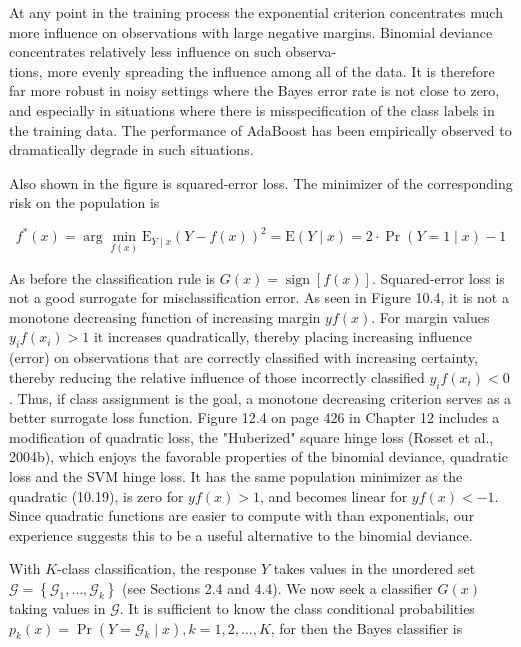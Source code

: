 \documentclass[10pt]{article}
\begin{document}
At any point in the training process the exponential criterion concentrates much more influence on observations with large negative margins. Binomial deviance concentrates relatively less influence on such observa-\\
tions, more evenly spreading the influence among all of the data. It is therefore far more robust in noisy settings where the Bayes error rate is not close to zero, and especially in situations where there is misspecification of the class labels in the training data. The performance of AdaBoost has been empirically observed to dramatically degrade in such situations.

Also shown in the figure is squared-error loss. The minimizer of the corresponding risk on the population is


\begin{equation*}
f^{*}(x)=\arg \min _{f(x)} \mathrm{E}_{Y \mid x}(Y-f(x))^{2}=\mathrm{E}(Y \mid x)=2 \cdot \operatorname{Pr}(Y=1 \mid x)-1 \tag{10.19}
\end{equation*}


As before the classification rule is $G(x)=\operatorname{sign}[f(x)]$. Squared-error loss is not a good surrogate for misclassification error. As seen in Figure 10.4, it is not a monotone decreasing function of increasing margin $y f(x)$. For margin values $y_{i} f\left(x_{i}\right)>1$ it increases quadratically, thereby placing increasing influence (error) on observations that are correctly classified with increasing certainty, thereby reducing the relative influence of those incorrectly classified $y_{i} f\left(x_{i}\right)<0$. Thus, if class assignment is the goal, a monotone decreasing criterion serves as a better surrogate loss function. Figure 12.4 on page 426 in Chapter 12 includes a modification of quadratic loss, the "Huberized" square hinge loss (Rosset et al., 2004b), which enjoys the favorable properties of the binomial deviance, quadratic loss and the SVM hinge loss. It has the same population minimizer as the quadratic (10.19), is zero for $y f(x)>1$, and becomes linear for $y f(x)<-1$. Since quadratic functions are easier to compute with than exponentials, our experience suggests this to be a useful alternative to the binomial deviance.

With $K$-class classification, the response $Y$ takes values in the unordered set $\mathcal{G}=\left\{\mathcal{G}_{1}, \ldots, \mathcal{G}_{k}\right\}$ (see Sections 2.4 and 4.4). We now seek a classifier $G(x)$ taking values in $\mathcal{G}$. It is sufficient to know the class conditional probabilities $p_{k}(x)=\operatorname{Pr}\left(Y=\mathcal{G}_{k} \mid x\right), k=1,2, \ldots, K$, for then the Bayes classifier is
\end{document}
